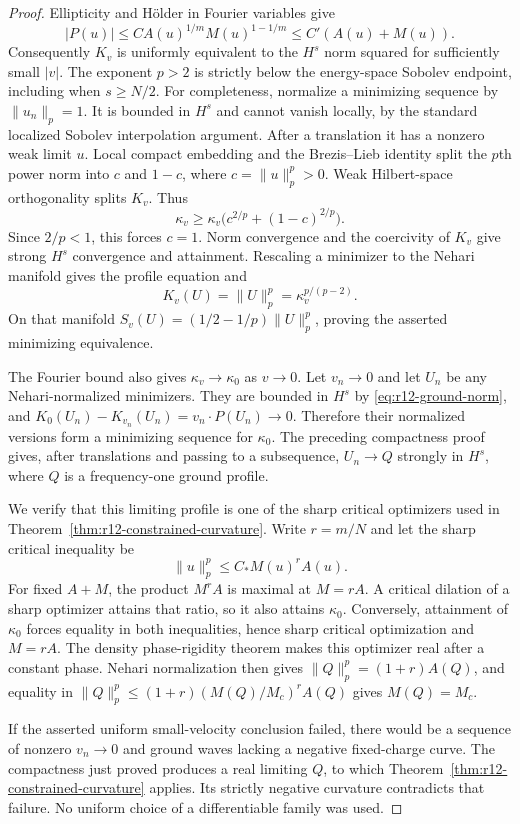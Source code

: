 \begin{proof}
Ellipticity and H\"older in Fourier variables give
\[
 |P(u)|\leq C A(u)^{1/m}M(u)^{1-1/m}
          \leq C'(A(u)+M(u)).
\]
Consequently $K_v$ is uniformly equivalent to the $H^s$ norm squared
for sufficiently small $|v|$. The exponent $p>2$ is strictly below the
energy-space Sobolev endpoint, including when $s\geq N/2$.
For completeness, normalize a minimizing sequence by $\|u_n\|_p=1$.
It is bounded in $H^s$ and cannot vanish locally, by the standard
localized Sobolev interpolation argument. After a translation it has a
nonzero weak limit $u$. Local compact embedding and the
Brezis--Lieb identity split the $p$th power norm into $c$ and $1-c$,
where $c=\|u\|_p^p>0$. Weak Hilbert-space orthogonality splits $K_v$.
Thus
\[
 \kappa_v\geq\kappa_v\big(c^{2/p}+(1-c)^{2/p}\big).
\]
Since $2/p<1$, this forces $c=1$. Norm convergence and the coercivity of
$K_v$ give strong $H^s$ convergence and attainment. Rescaling a minimizer
to the Nehari manifold gives the profile equation and
\begin{equation}\label{eq:r12-ground-norm}
 K_v(U)=\|U\|_p^p=\kappa_v^{p/(p-2)}.
\end{equation}
On that manifold $S_v(U)=(1/2-1/p)\|U\|_p^p$, proving the asserted
minimizing equivalence.

The Fourier bound also gives $\kappa_v\to\kappa_0$ as $v\to0$.
Let $v_n\to0$ and let $U_n$ be any Nehari-normalized minimizers.
They are bounded in $H^s$ by \eqref{eq:r12-ground-norm}, and
$K_0(U_n)-K_{v_n}(U_n)=v_n\cdot P(U_n)\to0$. Therefore their normalized
versions form a minimizing sequence for $\kappa_0$.
The preceding compactness proof gives, after translations and passing to
a subsequence, $U_n\to Q$ strongly in $H^s$, where $Q$ is a
frequency-one ground profile.

We verify that this limiting profile is one of the sharp critical
optimizers used in Theorem~\ref{thm:r12-constrained-curvature}.
Write $r=m/N$ and let the sharp critical inequality be
\[
 \|u\|_p^p\leq C_* M(u)^r A(u).
\]
For fixed $A+M$, the product $M^rA$ is maximal at $M=rA$.
A critical dilation of a sharp optimizer attains that ratio, so it also
attains $\kappa_0$. Conversely, attainment of $\kappa_0$ forces equality
in both inequalities, hence sharp critical optimization and $M=rA$.
The density phase-rigidity theorem makes this optimizer real after a
constant phase. Nehari normalization then gives
$\|Q\|_p^p=(1+r)A(Q)$, and equality in
$\|Q\|_p^p\leq(1+r)(M(Q)/M_c)^r A(Q)$ gives $M(Q)=M_c$.

If the asserted uniform small-velocity conclusion failed, there would
be a sequence of nonzero $v_n\to0$ and ground waves lacking a negative
fixed-charge curve. The compactness just proved produces a real limiting
$Q$, to which Theorem~\ref{thm:r12-constrained-curvature} applies. Its
strictly negative curvature contradicts that failure. No uniform
choice of a differentiable family was used.
\end{proof}

